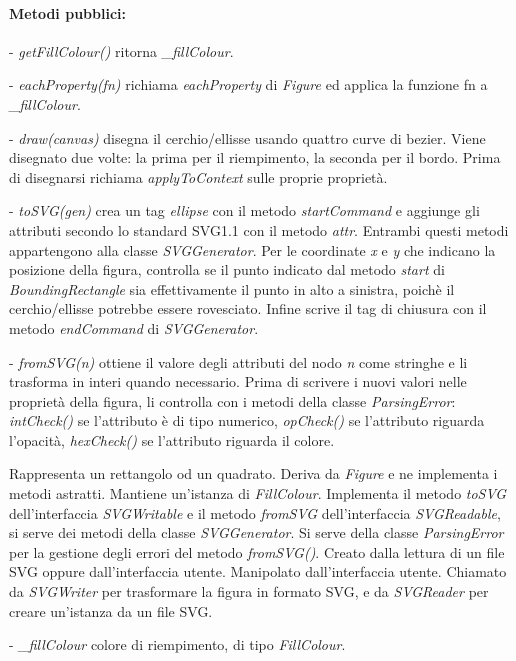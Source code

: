 \paragraph{Metodi pubblici:}
\begin{elencopuntato}[\subsubsecindent]
\item[-] \textit{getFillColour()} ritorna \textit{{\_}fillColour}.
\item[-] \textit{eachProperty(fn)} richiama \textit{eachProperty} di \textit{Figure} ed applica la funzione fn a \textit{{\_}fillColour}.
\item[-] \textit{draw(canvas)} disegna il cerchio/ellisse usando quattro curve di bezier. Viene disegnato due volte: la prima per il riempimento, la seconda per il bordo. Prima di disegnarsi richiama \textit{applyToContext} sulle proprie propriet\`a.
\item[-] \textit{toSVG(gen)} crea un tag \textit{ellipse} con il metodo \textit{startCommand} e aggiunge gli attributi secondo lo standard SVG1.1 con il metodo \textit{attr}. Entrambi questi metodi appartengono alla classe \textit{SVGGenerator}. Per le coordinate \textit{x} e \textit{y} che indicano la posizione della figura, controlla se il punto indicato dal metodo \textit{start} di \textit{BoundingRectangle} sia effettivamente il punto in alto a sinistra, poich\`e il cerchio/ellisse potrebbe essere rovesciato. Infine scrive il tag di chiusura con il metodo \textit{endCommand} di \textit{SVGGenerator}.
\item[-] \textit{fromSVG(n)} ottiene il valore degli attributi del nodo \textit{n} come stringhe e li trasforma in interi quando necessario. Prima di scrivere i nuovi valori nelle propriet\`a della figura, li controlla con i metodi della classe \textit{ParsingError}: \textit{intCheck()} se l'attributo \`e di tipo numerico, \textit{opCheck()} se l'attributo riguarda l'opacit\`a, \textit{hexCheck()} se l'attributo riguarda il colore.
\end{elencopuntato}

Rappresenta un rettangolo od un quadrato.
Deriva da \textit{Figure} e ne implementa i metodi astratti. Mantiene un'istanza di \textit{FillColour}. Implementa il metodo \textit{toSVG} dell'interfaccia \textit{SVGWritable} e il metodo \textit{fromSVG} dell'interfaccia \textit{SVGReadable}, si serve dei metodi della classe \textit{SVGGenerator}. Si serve della classe \textit{ParsingError} per la gestione degli errori del metodo \textit{fromSVG()}.
Creato dalla lettura di un file SVG oppure dall'interfaccia utente. Manipolato dall'interfaccia utente. Chiamato da \textit{SVGWriter} per trasformare la figura in formato SVG, e da \textit{SVGReader} per creare un'istanza da un file SVG.
\begin{elencopuntato}[\subsubsecindent]
\item[-] \textit{{\_}fillColour} colore di riempimento, di tipo \textit{FillColour}.
\end{elencopuntato}
